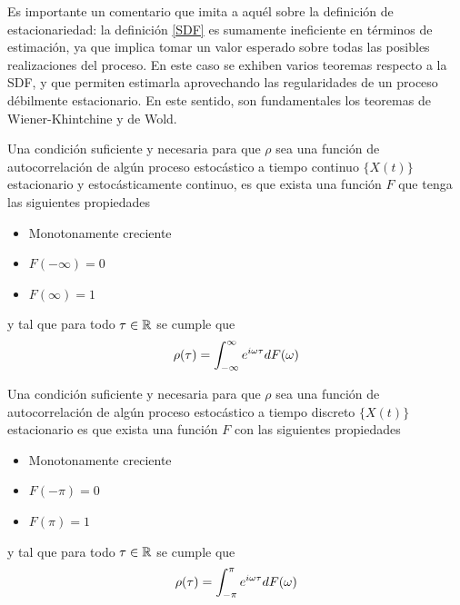

Es importante un comentario que imita a aqu\'el sobre la definici\'on de estacionariedad:
la definici\'on \ref{SDF} es sumamente ineficiente en t\'erminos de estimaci\'on, ya que implica
tomar un valor esperado sobre todas las posibles realizaciones del proceso.
En este caso se exhiben varios teoremas respecto a la SDF, y que permiten estimarla aprovechando
las regularidades de un proceso d\'ebilmente estacionario. 
En este sentido, son fundamentales los teoremas de Wiener-Khintchine y de Wold.

\begin{thrm}
Una condici\'on suficiente y necesaria para que $\rho$ sea una funci\'on de autocorrelaci\'on de 
alg\'un proceso estoc\'astico a tiempo continuo $\{X(t)\}$ estacionario y estoc\'asticamente 
continuo, es que exista una funci\'on $F$ que tenga las 
siguientes propiedades
\begin{itemize}
\item Monotonamente creciente
\item $F(-\infty) = 0$
\item $F(\infty) = 1$
\end{itemize}
y tal que para todo $\tau \in \mathbb{R}$ se cumple que
\begin{equation*}
\rho(\tau) = \int_{-\infty}^{\infty} e^{i \omega \tau} dF(\omega)
\end{equation*}
\end{thrm}

\begin{thrm}[Wold]
Una condici\'on suficiente y necesaria para que $\rho$ sea una funci\'on de autocorrelaci\'on de 
alg\'un proceso estoc\'astico a tiempo discreto $\{X(t)\}$ estacionario
es que exista una funci\'on $F$ con las 
siguientes propiedades
\begin{itemize}
\item Monotonamente creciente
\item $F(-\pi) = 0$
\item $F(\pi) = 1$
\end{itemize}
y tal que para todo $\tau \in \mathbb{R}$ se cumple que
\begin{equation*}
\rho(\tau) = \int_{-\pi}^{\pi} e^{i \omega \tau} dF(\omega)
\end{equation*}
\end{thrm}

